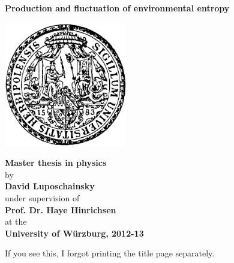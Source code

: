 \titlepage
\vspace*{1em}
\begin{center}
	\LARGE{\bfseries
		Production and fluctuation of environmental entropy
	}

	\vfill %

	\begin{center}
		\includegraphics[width=0.4\textwidth]{figures/unilogo.pdf}
	\end{center}

	\vfill %

	{\Large \bfseries Master thesis in physics} \\ [0.5cm]
	{\small by} \\
	{\Large \bfseries David Luposchainsky} \\ [0.5 cm]
	{\small under supervision of} \\
	{\Large \bfseries Prof. Dr. Haye Hinrichsen} \\ [0.5 cm]
	{\small at the} \\
	{\Large \bfseries University of W\"urzburg, 2012-13}

\end{center}
\newpage
If you see this, I forgot printing the title page separately.










